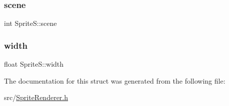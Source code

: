\subsubsection{\texorpdfstring{scene}{scene}}
{\footnotesize\ttfamily int Sprite\+S\+::scene}

\mbox{\label{struct_sprite_s_a5c2f062d7bfebc2dd3239838aeab4150}} 
\subsubsection{\texorpdfstring{width}{width}}
{\footnotesize\ttfamily float Sprite\+S\+::width}



The documentation for this struct was generated from the following file\+:\begin{DoxyCompactItemize}
\item 
src/\hyperlink{_sprite_renderer_8h}{Sprite\+Renderer.\+h}\end{DoxyCompactItemize}
